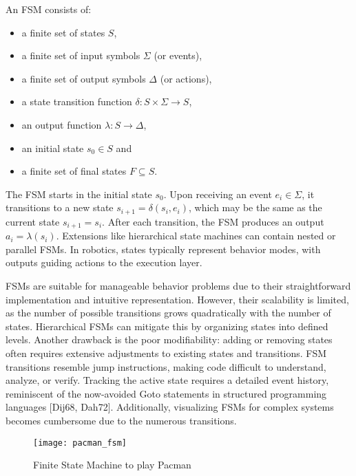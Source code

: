 An FSM consists of:

\begin{itemize}
  \item a finite set of states $S$,
  \item a finite set of input symbols $\Sigma$ (or events),
  \item a finite set of output symbols $\Delta$ (or actions),
  \item a state transition function $\delta: S \times \Sigma \rightarrow S$,
  \item an output function $\lambda: S \rightarrow \Delta$,
  \item an initial state $s_0 \in S$ and
  \item a finite set of final states $F \subseteq S$.
\end{itemize}

The FSM starts in the initial state $s_0$.
Upon receiving an event $e_i \in \Sigma$, it transitions to a new state $s_{i+1} = \delta(s_i, e_i)$, which may be the same as the current state $s_{i+1} = s_i$.
After each transition, the FSM produces an output $a_i = \lambda(s_i)$.
Extensions like hierarchical state machines can contain nested or parallel FSMs.
In robotics, states typically represent behavior modes, with outputs guiding actions to the execution layer.

FSMs are suitable for manageable behavior problems due to their straightforward implementation and intuitive representation.
However, their scalability is limited, as the number of possible transitions grows quadratically with the number of states.
Hierarchical FSMs can mitigate this by organizing states into defined levels.
Another drawback is the poor modifiability: adding or removing states often requires extensive adjustments to existing states and transitions.
FSM transitions resemble jump instructions, making code difficult to understand, analyze, or verify.
Tracking the active state requires a detailed event history, reminiscent of the now-avoided Goto statements in structured programming languages [Dij68, Dah72].
Additionally, visualizing FSMs for complex systems becomes cumbersome due to the numerous transitions.

\begin{figure}
  \centering
  \texttt{[image: pacman\_fsm]}

  \caption{Finite State Machine to play Pacman}%
  \label{fig:pacman_fsm}
\end{figure}

